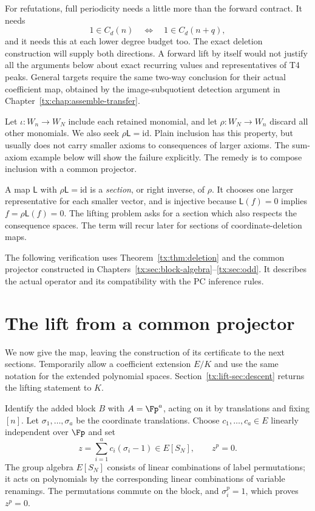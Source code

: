\documentclass[11pt,a4paper,oneside,openany]{book}
\theoremstyle{definition}\newtheorem{definition}[theorem]{Definition}
\theoremstyle{remark}\newtheorem{remark}[theorem]{Remark}
\numberwithin{equation}{chapter}
\begin{document}
For refutations, full periodicity needs a little more than the forward
contract. It needs
\begin{equation}\label{tx:eq:newiff}
 1\in C_d(n)\quad\Longleftrightarrow\quad1\in C_d(n+q),
\end{equation}
and it needs this at each lower degree budget too. The exact deletion
construction will supply both directions. A forward lift by itself
would not justify all the arguments below about exact recurring values and representatives of T4 peaks. General targets require the same two-way conclusion for their actual coefficient map, obtained by the image-subquotient detection argument in Chapter~\ref{tx:chap:assemble-transfer}.

Let $\iota:W_n\to W_N$ include each retained monomial, and let
$\rho:W_N\to W_n$ discard all other monomials. We also seek
$\rho\mathsf L=\mathrm{id}$. Plain inclusion has this property, but
usually does not carry smaller axioms to consequences of larger axioms.
The sum-axiom example below will show the failure
explicitly. The remedy is to compose inclusion with a common projector.

A map $\mathsf L$ with $\rho\mathsf L=\mathrm{id}$ is a
\emph{section}, or right inverse, of $\rho$. It chooses one larger
representative for each smaller vector, and is injective because
$\mathsf L(f)=0$ implies $f=\rho\mathsf L(f)=0$.
The lifting problem asks for a section which also respects the
consequence spaces. The term will recur later for sections of
coordinate-deletion maps.

The following verification uses Theorem~\ref{tx:thm:deletion} and the common projector constructed in Chapters~\ref{tx:sec:block-algebra}--\ref{tx:sec:odd}. It describes the actual operator and its compatibility with the PC inference rules.

\section{The lift from a common projector}\label{tx:lift-sec:formula}
We now give the map, leaving the construction of its certificate to the
next sections. Temporarily allow a coefficient extension $E/K$ and use
the same notation for the extended polynomial spaces. Section~\ref{tx:lift-sec:descent}
returns the lifting statement to $K$.

Identify the added block $B$ with $A=\Fp^a$, acting on it by translations
and fixing $[n]$. Let $\sigma_1,\ldots,\sigma_a$ be the coordinate
translations. Choose $c_1,\ldots,c_a\in E$ linearly independent over
$\Fp$ and set
\[
 z=\sum_{i=1}^a c_i(\sigma_i-1)\in E[S_N],\qquad z^p=0.
\]
The group algebra $E[S_N]$ consists of linear combinations of label
permutations; it acts on polynomials by the corresponding linear
combinations of variable renamings. The permutations commute on the
block, and $\sigma_i^p=1$, which proves $z^p=0$.
\end{document}
